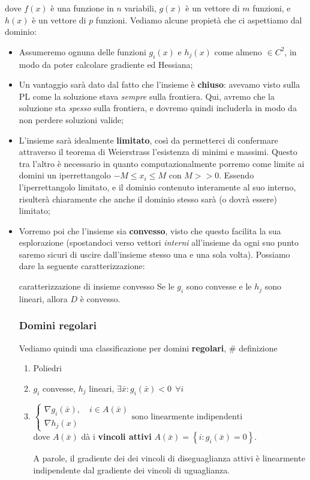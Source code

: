 \documentclass[a4paper,11pt]{article}
\begin{document}
dove $f(x)$ è una funzione in $n$ variabili, $g(x)$ è un vettore di $m$ funzioni, e $h(x)$ è un vettore di $p$ funzioni.
Vediamo alcune propietà che ci aspettiamo dal dominio:
\begin{itemize}
	\item Assumeremo ognuna delle funzioni $g_i(x)$ e $h_j(x)$ come almeno $\in C^2$, in modo da poter calcolare gradiente ed Hessiana;
	\item Un vantaggio sarà dato dal fatto che l'insieme è \textbf{chiuso}: avevamo visto sulla PL come la soluzione stava \textit{sempre} sulla frontiera. Qui, avremo che la soluzione sta \textit{spesso} sulla frontiera, e dovremo quindi includerla in modo da non perdere soluzioni valide;
	\item L'insieme sarà idealmente \textbf{limitato}, così da permetterci di confermare attraverso il teorema di Weierstrass l'esistenza di minimi e massimi.
Questo tra l'altro è necessario in quanto computazionalmente porremo come limite ai domini un iperrettangolo $-M \leq x_i \leq M$ con $M >> 0$.
Essendo l'iperrettangolo limitato, e il dominio contenuto interamente al suo interno, risulterà chiaramente che anche il dominio stesso sarà (o dovrà essere) limitato;
\item Vorremo poi che l'insieme sia \textbf{convesso}, visto che questo facilita la sua esplorazione (spostandoci verso vettori \textit{interni} all'insieme da ogni suo punto saremo sicuri di uscire dall'insieme stesso una e una sola volta).
	Possiamo dare la seguente caratterizzazione:
	\begin{theorem}{caratterizzazione di insieme convesso}
		Se le $g_i$ sono convesse e le $h_j$ sono lineari, allora $D$ è convesso.
	\end{theorem}

\subsubsection{Domini regolari}
Vediamo quindi una classificazione per domini \textbf{regolari}, # definizione

\begin{enumerate}
	\item Poliedri
	\item $g_i$ convesse, $h_j$ lineari, $\exists \bar{x} : g_i(\bar{x}) < 0 \ \ \forall i$
	\item $
		\begin{cases}
			\nabla g_i(\bar{x}), \quad i \in A(\bar{x})	\\ 
			\nabla h_j(x)
		\end{cases}
		\text{sono linearmente indipendenti}
	$ \\
	dove $A(\bar{x})$ dà i \textbf{vincoli attivi} $A(\bar{x}) = \left\{ i : g_i(\bar{x}) = 0 \right\}$.

	A parole, il gradiente dei dei vincoli di diseguaglianza attivi è linearmente indipendente dal gradiente dei vincoli di uguaglianza.
\end{enumerate}

\end{itemize}
\end{document}
